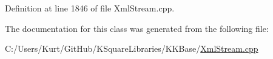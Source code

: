 Definition at line 1846 of file Xml\+Stream.\+cpp.



The documentation for this class was generated from the following file\+:\begin{DoxyCompactItemize}
\item 
C\+:/\+Users/\+Kurt/\+Git\+Hub/\+K\+Square\+Libraries/\+K\+K\+Base/\hyperlink{_xml_stream_8cpp}{Xml\+Stream.\+cpp}\end{DoxyCompactItemize}
